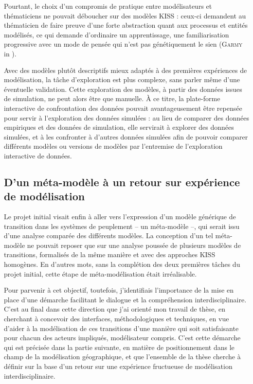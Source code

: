 Pourtant, le choix d'un compromis de pratique entre modélisateurs et thématiciens ne pouvait déboucher sur des modèles KISS : ceux-ci demandent au thématicien de faire preuve d'une forte abstraction quant aux processus et entités modélisés, ce qui demande d'ordinaire \og un apprentissage, une familiarisation progressive avec un mode de pensée qui n’est pas génétiquement le sien\fg{} (\textsc{Garmy} in \cite[477]{ouriachi_lelaboration_2017}).

Avec des modèles plutôt descriptifs mieux adaptés à des premières expériences de modélisation, la tâche d'exploration est plus complexe, sans parler même d'une éventuelle validation.
Cette exploration des modèles, à partir des données issues de simulation, ne peut alors être que manuelle.
À ce titre, la plate-forme interactive de confrontation des données pouvait avantageusement être repensée pour servir à l'exploration des données simulées : au lieu de comparer des données empiriques et des données de simulation, elle servirait à explorer des données simulées, et à les confronter à d'autres données simulées afin de pouvoir comparer différents modèles ou versions de modèles par l'entremise de l'exploration interactive de données.

\subsection{D'un méta-modèle à un retour sur expérience de modélisation}

Le projet initial visait enfin à aller vers l'expression d'un modèle générique de transition dans les systèmes de peuplement -- un méta-modèle --, qui serait issu d'une analyse comparée des différents modèles.
La conception d'un tel méta-modèle ne pouvait reposer que sur une analyse poussée de plusieurs modèles de transitions, formalisés de la même manière et avec des approches KISS homogènes.
En d'autres mots, sans la complétion des deux premières tâches du projet initial, cette étape de méta-modélisation était irréalisable.

Pour parvenir à cet objectif, toutefois, j'identifiais l'importance de \og la mise en place d'une démarche facilitant le dialogue et la compréhension interdisciplinaire\fg{}.
C'est au final dans cette direction que j'ai orienté mon travail de thèse, en cherchant à concevoir des \og interfaces\fg{}, méthodologiques et techniques, en vue d'aider à la modélisation de ces transitions d'une manière qui soit satisfaisante pour chacun des acteurs impliqués, modélisateur compris.
C'est cette démarche qui est précisée dans la partie suivante, en matière de positionnement dans le champ de la modélisation géographique, et que l'ensemble de la thèse cherche à définir sur la base d'un retour sur une expérience fructueuse de modélisation interdisciplinaire.


